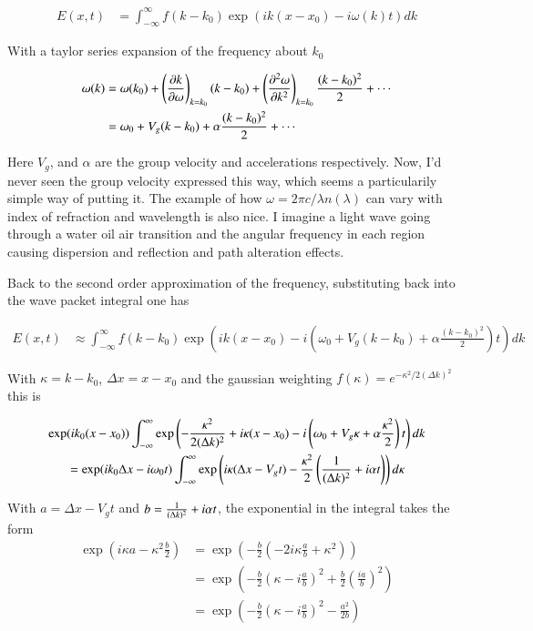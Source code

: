 \documentclass{article}
\newcommand{\PDSq}[2]{\frac{\partial^2 {#2}}{\partial {#1}^2}}
\newcommand{\IIinf}[0]{ \int_{-\infty}^\infty }
\begin{document}
\begin{align*}
E(x,t) &= \IIinf f(k - k_0) \exp\left( i k(x-x_0) - i\omega(k) t\right) dk
\end{align*}

With a taylor series expansion of the frequency about $k_0$

\begin{align*}
\omega(k) 
&= \omega(k_0) + \left(\PD{k}{\omega}\right)_{k=k_0} (k-k_0) + \left(\PDSq{k}{\omega}\right)_{k=k_0} \frac{(k-k_0)^2}{2} + \cdots \\
&= \omega_0 + V_g (k-k_0) + \alpha \frac{(k-k_0)^2}{2} + \cdots \\
\end{align*}

Here $V_g$, and $\alpha$ are the group velocity and accelerations respectively.  Now, I'd never seen the group velocity expressed
this way, which seems a particularily simple way of putting it.
The example of how $\omega = 2 \pi c/\lambda n(\lambda)$ can vary with index of refraction and wavelength is also nice.  I
imagine a light wave going through a water oil air transition and the angular frequency in each region causing dispersion and 
reflection and path alteration effects.

Back to the second order approximation of the frequency, substituting back into the wave packet integral one has

\begin{align*}
E(x,t) &\approx \IIinf f(k - k_0) \exp\left( i k(x-x_0) - i
\left(\omega_0 + V_g (k-k_0) + \alpha \frac{(k-k_0)^2}{2} \right)
t\right) dk
\end{align*}

With $\kappa = k - k_0$, $\Delta x = x -x_0$ and the gaussian weighting $f(\kappa) = e^{-\kappa^2/2(\Delta k)^2}$ this is

\begin{align*}
\exp&( i k_0 (x-x_0) )
\IIinf 
\exp\left( -\frac{\kappa^2}{2(\Delta k)^2} +i \kappa (x-x_0) 
- i \left(\omega_0 + V_g \kappa + \alpha \frac{\kappa^2}{2} \right) t\right) dk \\
&=
\exp( i k_0 \Delta x -i \omega_0 t)
\IIinf 
\exp\left( 
i \kappa ( \Delta x - V_g t )
-\frac{\kappa^2}{2} \left(\inv{(\Delta k)^2} + i \alpha t \right)
\right) d\kappa \\
\end{align*}

With $a = \Delta x - V_g t$ and $b = \frac{1}{(\Delta k)^2} + i \alpha t$, the exponential in the integral takes the form
\begin{align*}
\exp\left( i \kappa a - \kappa^2 \frac{b}{2} \right) 
&= \exp\left( - \frac{b}{2}\left(-2 i \kappa \frac{a}{b} + \kappa^2 \right) \right)  \\
&= \exp\left( - \frac{b}{2}\left( \kappa - i \frac{a}{b} \right)^2 + \frac{b}{2}\left(\frac{ia}{b}\right)^2 \right)  \\
&= \exp\left( - \frac{b}{2}\left( \kappa - i \frac{a}{b} \right)^2 - \frac{a^2}{2b} \right)  \\
\end{align*}
\end{document}
